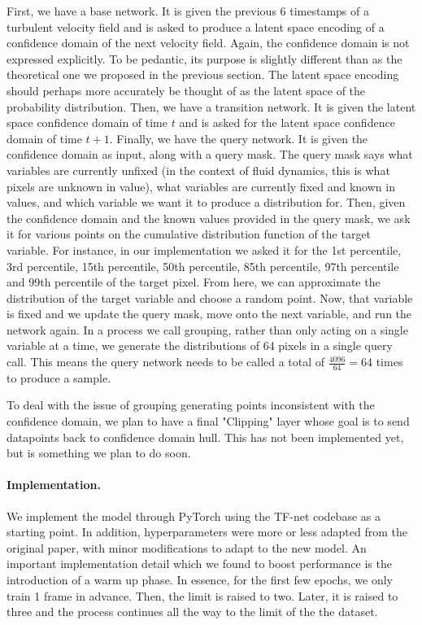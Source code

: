\documentclass{article}
\begin{document}
    First, we have a base network. It is given the previous 6 timestamps of a turbulent velocity field and is asked to produce a latent space encoding of a confidence domain of the next velocity field. Again, the confidence domain is not expressed explicitly. To be pedantic, its purpose is slightly different than as the theoretical one we proposed in the previous section. The latent space encoding should perhaps more accurately be thought of as the latent space of the probability distribution. Then, we have a transition network. It is given the latent space confidence domain of time $t$ and is asked for the latent space confidence domain of time $t + 1$. Finally, we have the query network. It is given the confidence domain as input, along with a query mask. The query mask says what variables are currently unfixed (in the context of fluid dynamics, this is what pixels are unknown in value), what variables are currently fixed and known in values, and which variable we want it to produce a distribution for. Then, given the confidence domain and the known values provided in the query mask, we ask it for various points on the cumulative distribution function of the target variable. For instance, in our implementation we asked it for the 1st percentile, 3rd percentile, 15th percentile, 50th percentile, 85th percentile, 97th percentile and 99th percentile of the target pixel. From here, we can approximate the distribution of the target variable and choose a random point. Now, that variable is fixed and we update the query mask, move onto the next variable, and run the network again. In a process we call grouping, rather than only acting on a single variable at a time, we generate the distributions of 64 pixels in a single query call. This means the query network needs to be called a total of $\frac{4096}{64}=64$ times to produce a sample.

    To deal with the issue of grouping generating points inconsistent with the confidence domain, we plan to have a final "Clipping" layer whose goal is to send datapoints back to confidence domain hull. This has not been implemented yet, but is something we plan to do soon.

    \paragraph{Implementation.} We implement the model through PyTorch using the TF-net \cite{Wang2020TF} codebase as a starting point. In addition, hyperparameters were more or less adapted from the original paper, with minor modifications to adapt to the new model. An important implementation detail which we found to boost performance is the introduction of a warm up phase. In essence, for the first few epochs, we only train 1 frame in advance. Then, the limit is raised to two. Later, it is raised to three and the process continues all the way to the limit of the the dataset.
\end{document}
